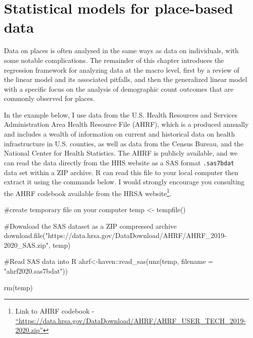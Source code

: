\documentclass[
  letterpaper,
  DIV=11,
  numbers=noendperiod]{scrreprt}
\newenvironment{Shaded}{\begin{snugshade}}{\end{snugshade}}
\newcommand{\AttributeTok}[1]{\textcolor[rgb]{0.40,0.45,0.13}{#1}}
\newcommand{\CommentTok}[1]{\textcolor[rgb]{0.37,0.37,0.37}{#1}}
\newcommand{\FunctionTok}[1]{\textcolor[rgb]{0.28,0.35,0.67}{#1}}
\newcommand{\NormalTok}[1]{\textcolor[rgb]{0.00,0.23,0.31}{#1}}
\newcommand{\OtherTok}[1]{\textcolor[rgb]{0.00,0.23,0.31}{#1}}
\newcommand{\SpecialCharTok}[1]{\textcolor[rgb]{0.37,0.37,0.37}{#1}}
\newcommand{\StringTok}[1]{\textcolor[rgb]{0.13,0.47,0.30}{#1}}
\begin{document}
\hypertarget{statistical-models-for-place-based-data}{%
\section{Statistical models for place-based
data}\label{statistical-models-for-place-based-data}}

Data on places is often analysed in the same ways as data on
individuals, with some notable complications. The remainder of this
chapter introduces the regression framework for analyzing data at the
macro level, first by a review of the linear model and its associated
pitfalls, and then the generalized linear model with a specific focus on
the analysis of demographic count outcomes that are commonly observed
for places.

In the example below, I use data from the U.S. Health Resources and
Services Administration Area Health Resource File (AHRF), which is a
produced annually and includes a wealth of information on current and
historical data on health infrastructure in U.S. counties, as well as
data from the Census Bureau, and the National Center for Health
Statistics. The AHRF is publicly available, and we can read the data
directly from the HHS website as a SAS format \texttt{.sas7bdat} data
set within a ZIP archive. R can read this file to your local computer
then extract it using the commands below. I would strongly encourage you
consulting the AHRF codebook available from the HRSA website\footnote{Link
  to AHRF codebook -
  \href{https://data.hrsa.gov/DataDownload/AHRF/AHRF_USER_TECH_2019-2020.zip}{``https://data.hrsa.gov/DataDownload/AHRF/AHRF\_USER\_TECH\_2019-2020.zip''}}.

\begin{Shaded}
\begin{Highlighting}[]
\CommentTok{\#create temporary file on  your computer}
\NormalTok{temp }\OtherTok{\textless{}{-}} \FunctionTok{tempfile}\NormalTok{()}

\CommentTok{\#Download the SAS dataset as a ZIP compressed archive}
\FunctionTok{download.file}\NormalTok{(}\StringTok{"https://data.hrsa.gov/DataDownload/AHRF/AHRF\_2019{-}2020\_SAS.zip"}\NormalTok{, temp)}

\CommentTok{\#Read SAS data into R}
\NormalTok{ahrf}\OtherTok{\textless{}{-}}\NormalTok{haven}\SpecialCharTok{::}\FunctionTok{read\_sas}\NormalTok{(}\FunctionTok{unz}\NormalTok{(temp,}
                          \AttributeTok{filename =} \StringTok{"ahrf2020.sas7bdat"}\NormalTok{))}

\FunctionTok{rm}\NormalTok{(temp)}
\end{Highlighting}
\end{Shaded}
\end{document}
